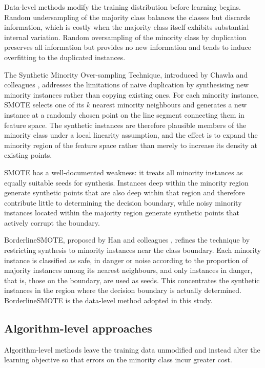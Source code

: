 \documentclass[12pt,a4paper,oneside]{report}
\begin{document}
Data-level methods modify the training distribution before learning begins. Random undersampling of the majority class balances the classes but discards information, which is costly when the majority class itself exhibits substantial internal variation. Random oversampling of the minority class by duplication preserves all information but provides no new information and tends to induce overfitting to the duplicated instances.

The Synthetic Minority Over-sampling Technique, introduced by Chawla and colleagues \cite{chawla2002}, addresses the limitations of naive duplication by synthesising new minority instances rather than copying existing ones. For each minority instance, SMOTE selects one of its $k$ nearest minority neighbours and generates a new instance at a randomly chosen point on the line segment connecting them in feature space. The synthetic instances are therefore plausible members of the minority class under a local linearity assumption, and the effect is to expand the minority region of the feature space rather than merely to increase its density at existing points.

SMOTE has a well-documented weakness: it treats all minority instances as equally suitable seeds for synthesis. Instances deep within the minority region generate synthetic points that are also deep within that region and therefore contribute little to determining the decision boundary, while noisy minority instances located within the majority region generate synthetic points that actively corrupt the boundary.

BorderlineSMOTE, proposed by Han and colleagues \cite{han2005}, refines the technique by restricting synthesis to minority instances near the class boundary. Each minority instance is classified as safe, in danger or noise according to the proportion of majority instances among its nearest neighbours, and only instances in danger, that is, those on the boundary, are used as seeds. This concentrates the synthetic instances in the region where the decision boundary is actually determined. BorderlineSMOTE is the data-level method adopted in this study.

\subsection{Algorithm-level approaches}

Algorithm-level methods leave the training data unmodified and instead alter the learning objective so that errors on the minority class incur greater cost.
\end{document}
